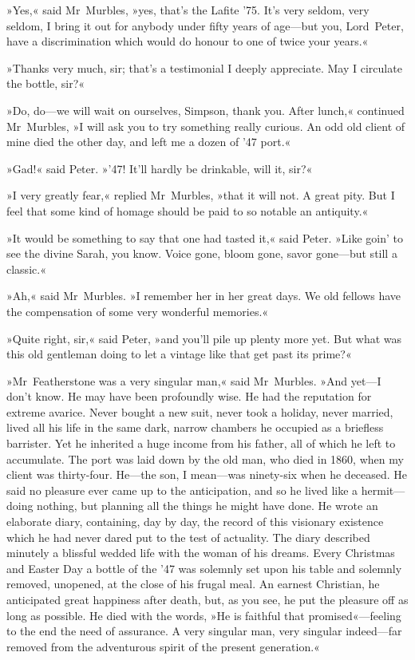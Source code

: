 »Yes,« said Mr~Murbles, »yes, that's the Lafite '75. It's very seldom, very seldom, I bring it out for anybody under fifty years of age—but you, Lord~Peter, have a discrimination which would do honour to one of twice your years.«

»Thanks very much, sir; that's a testimonial I deeply appreciate. May I circulate the bottle, sir?«

»Do, do—we will wait on ourselves, Simpson, thank you. After lunch,« continued Mr~Murbles, »I will ask you to try something really curious.  An odd old client of mine died the other day, and left me a dozen of '47 port.«

»Gad!« said Peter. »'47! It'll hardly be drinkable, will it, sir?«

»I very greatly fear,« replied Mr~Murbles, »that it will not. A great pity. But I feel that some kind of homage should be paid to so notable an antiquity.«

»It would be something to say that one had tasted it,« said Peter. »Like goin' to see the divine Sarah, you know. Voice gone, bloom gone, savor gone—but still a classic.«

»Ah,« said Mr~Murbles. »I remember her in her great days. We old fellows have the compensation of some very wonderful memories.«

»Quite right, sir,« said Peter, »and you'll pile up plenty more yet.  But what was this old gentleman doing to let a vintage like that get past its prime?«

»Mr~Featherstone was a very singular man,« said Mr~Murbles. »And yet—I don't know. He may have been profoundly wise. He had the reputation for extreme avarice. Never bought a new suit, never took a holiday, never married, lived all his life in the same dark, narrow chambers he occupied as a briefless barrister. Yet he inherited a huge income from his father, all of which he left to accumulate. The port was laid down by the old man, who died in 1860, when my client was thirty-four. He—the son, I mean—was ninety-six when he deceased. He said no pleasure ever came up to the anticipation, and so he lived like a hermit—doing nothing, but planning all the things he might have done. He wrote an elaborate diary, containing, day by day, the record of this visionary existence which he had never dared put to the test of actuality. The diary described minutely a blissful wedded life with the woman of his dreams. Every Christmas and Easter Day a bottle of the '47 was solemnly set upon his table and solemnly removed, unopened, at the close of his frugal meal. An earnest Christian, he anticipated great happiness after death, but, as you see, he put the pleasure off as long as possible. He died with the words, »He is faithful that promised«—feeling to the end the need of assurance. A very singular man, very singular indeed—far removed from the adventurous spirit of the present generation.«

